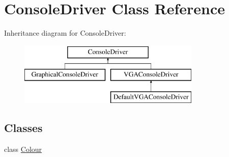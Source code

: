\hypertarget{class_console_driver}{}\section{Console\+Driver Class Reference}
\label{class_console_driver}
Inheritance diagram for Console\+Driver\+:\begin{figure}[H]
\begin{center}
\leavevmode
\includegraphics[height=3.000000cm]{class_console_driver}
\end{center}
\end{figure}
\subsection*{Classes}
\begin{DoxyCompactItemize}
\item 
class \hyperlink{class_console_driver_1_1_colour}{Colour}
\end{DoxyCompactItemize}
